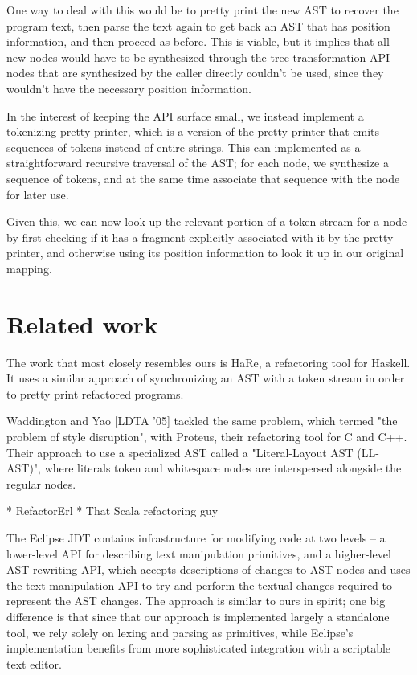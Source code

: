 One way to deal with this would be to pretty print the new AST to recover the
program text, then parse the text again to get back an AST that has position
information, and then proceed as before. This is viable, but it implies that
all new nodes would have to be synthesized through the tree transformation API
-- nodes that are synthesized by the caller directly couldn't be used, since
they wouldn't have the necessary position information.

In the interest of keeping the API surface small, we instead implement a
tokenizing pretty printer, which is a version of the pretty printer that emits
sequences of tokens instead of entire strings. This can implemented as a
straightforward recursive traversal of the AST; for each node, we synthesize a
sequence of tokens, and at the same time associate that sequence with the node
for later use.

Given this, we can now look up the relevant portion of a token stream for a node
by first checking if it has a fragment explicitly associated with it by the
pretty printer, and otherwise using its position information to look it up in
our original mapping.

\section{Related work}

The work that most closely resembles ours is HaRe, a refactoring tool for
Haskell.  It uses a similar approach of synchronizing an AST with a token
stream in order to pretty print refactored programs.

Waddington and Yao [LDTA '05] tackled the same problem, which termed "the
problem of style disruption", with Proteus, their refactoring tool for C and
C++. Their approach to use a specialized AST called a "Literal-Layout AST
(LL-AST)", where literals token and whitespace nodes are interspersed alongside
the regular nodes.

* RefactorErl * That Scala refactoring guy


The Eclipse JDT contains infrastructure for modifying code at two levels -- a
lower-level API for describing text manipulation primitives, and a higher-level
AST rewriting API, which accepts descriptions of changes to AST nodes and uses
the text manipulation API to try and perform the textual changes required to
represent the AST changes. The approach is similar to ours in spirit; one big
difference is that since that our approach is implemented largely a standalone
tool, we rely solely on lexing and parsing as primitives, while Eclipse's
implementation benefits from more sophisticated integration with a scriptable
text editor.
